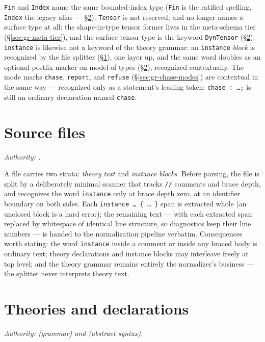\noindent \texttt{Fin} and \texttt{Index} name the same bounded-index
type (\texttt{Fin} is the ratified spelling, \texttt{Index} the
legacy alias --- \S\ref{sec:gr-decls}). \texttt{Tensor} is not
reserved, and no longer names a surface type at all: the
shape-in-type tensor former lives in the meta-schema tier
(\S\ref{sec:gr-meta-tier}), and the surface tensor type is the
keyword \texttt{DynTensor} (\S\ref{sec:gr-decls}). \texttt{instance}
is likewise not a keyword of the theory grammar: an
\texttt{instance} \emph{block} is recognized by the file splitter
(\S\ref{sec:gr-files}), one layer up, and the same word doubles as
an optional postfix marker on model-of types
(\S\ref{sec:gr-decls}), recognized contextually. The mode marks
\texttt{chase}, \texttt{report}, and \texttt{refuse}
(\S\ref{sec:gr-chase-modes}) are contextual in the same way ---
recognized only as a statement's leading token: \texttt{chase : …;}
is still an ordinary declaration named \texttt{chase}.

\section{Source files}
\label{sec:gr-files}

\emph{Authority: .}

A  file carries two strata: \emph{theory text} and
\emph{instance blocks}. Before parsing, the file is split by a
deliberately minimal scanner that tracks \texttt{//} comments and
brace depth, and recognizes the word \texttt{instance} only at brace
depth zero, at an identifier boundary on both sides. Each
\texttt{instance … \{ … \}} span is extracted whole (an unclosed
block is a hard error); the remaining text — with each extracted span
replaced by whitespace of identical line structure, so diagnostics
keep their line numbers — is handed to the normalization pipeline
verbatim. Consequences worth stating: the word \texttt{instance}
inside a comment or inside any braced body is ordinary text; theory
declarations and instance blocks may interleave freely at top level;
and the theory grammar remains entirely the normalizer's business —
the splitter never interprets theory text.

\section{Theories and declarations}
\label{sec:gr-decls}

\emph{Authority:  (grammar)
and  (abstract syntax).}


